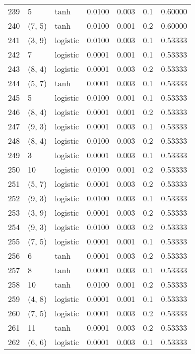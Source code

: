 \begin{tabular}{lllrrrr}
239 &           5 &      tanh &  0.0100 &  0.003 &  0.1 &   0.60000 \\
240 &      (7, 5) &      tanh &  0.0100 &  0.001 &  0.2 &   0.60000 \\
241 &      (3, 9) &  logistic &  0.0100 &  0.003 &  0.1 &   0.53333 \\
242 &           7 &  logistic &  0.0001 &  0.001 &  0.1 &   0.53333 \\
243 &      (8, 4) &  logistic &  0.0001 &  0.003 &  0.2 &   0.53333 \\
244 &      (5, 7) &      tanh &  0.0001 &  0.003 &  0.1 &   0.53333 \\
245 &           5 &  logistic &  0.0100 &  0.001 &  0.1 &   0.53333 \\
246 &      (8, 4) &  logistic &  0.0001 &  0.001 &  0.2 &   0.53333 \\
247 &      (9, 3) &  logistic &  0.0001 &  0.003 &  0.1 &   0.53333 \\
248 &      (8, 4) &  logistic &  0.0100 &  0.003 &  0.2 &   0.53333 \\
249 &           3 &  logistic &  0.0001 &  0.003 &  0.1 &   0.53333 \\
250 &          10 &  logistic &  0.0100 &  0.001 &  0.2 &   0.53333 \\
251 &      (5, 7) &  logistic &  0.0001 &  0.003 &  0.2 &   0.53333 \\
252 &      (9, 3) &  logistic &  0.0100 &  0.003 &  0.1 &   0.53333 \\
253 &      (3, 9) &  logistic &  0.0001 &  0.003 &  0.2 &   0.53333 \\
254 &      (9, 3) &  logistic &  0.0100 &  0.003 &  0.2 &   0.53333 \\
255 &      (7, 5) &  logistic &  0.0001 &  0.001 &  0.1 &   0.53333 \\
256 &           6 &      tanh &  0.0001 &  0.003 &  0.2 &   0.53333 \\
257 &           8 &      tanh &  0.0001 &  0.003 &  0.1 &   0.53333 \\
258 &          10 &      tanh &  0.0100 &  0.001 &  0.2 &   0.53333 \\
259 &      (4, 8) &  logistic &  0.0001 &  0.001 &  0.1 &   0.53333 \\
260 &      (7, 5) &  logistic &  0.0001 &  0.003 &  0.2 &   0.53333 \\
261 &          11 &      tanh &  0.0001 &  0.003 &  0.2 &   0.53333 \\
262 &      (6, 6) &  logistic &  0.0001 &  0.003 &  0.1 &   0.53333 \\

\end{tabular}
